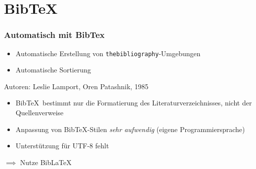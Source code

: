 \section{Bib\TeX}

\begin{frame}[fragile]
  \frametitle{Automatisch mit BibTex}
  \onslide<+->

  \begin{itemize} %
    \item<+-> Automatische Erstellung von \lstinline|thebibliography|-Umgebungen
    \item<+-> Automatische Sortierung
  \end{itemize}

  \onslide<+->

  Autoren: Leslie Lamport, Oren Patashnik, 1985

  \begin{itemize}
    \item<+-> Bib\TeX\ bestimmt nur die Formatierung des
      Literaturverzeichnisses, nicht der Quellenverweise
    \item<+-> Anpassung von Bib\TeX-Stilen \emph{sehr aufwendig} (eigene
      Programmiersprache) %
    \item<+-> Unterstützung für UTF-8 fehlt%
  \end{itemize}

  \centerline{$\implies$ Nutze Bib\LaTeX}
\end{frame}

